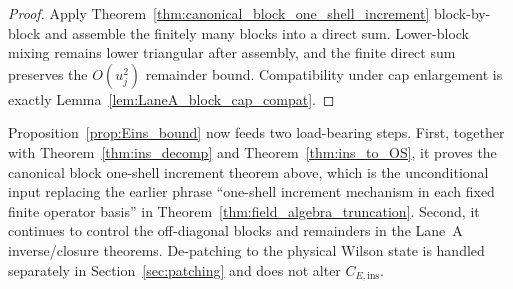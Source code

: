 \begin{proof}
Apply Theorem~\ref{thm:canonical_block_one_shell_increment} block-by-block and assemble the finitely many blocks into a direct sum.
Lower-block mixing remains lower triangular after assembly, and the finite direct sum preserves the $O(u_j^2)$ remainder bound.
Compatibility under cap enlargement is exactly Lemma~\ref{lem:LaneA_block_cap_compat}.
\end{proof}

\begin{remark}
Proposition~\ref{prop:Eins_bound} now feeds two load-bearing steps.
First, together with Theorem~\ref{thm:ins_decomp} and Theorem~\ref{thm:ins_to_OS}, it proves the canonical block one-shell increment theorem above,
which is the unconditional input replacing the earlier phrase ``one-shell increment mechanism in each fixed finite operator basis'' in Theorem~\ref{thm:field_algebra_truncation}.
Second, it continues to control the off-diagonal blocks and remainders in the Lane~A inverse/closure theorems.
De-patching to the physical Wilson state is handled separately in Section~\ref{sec:patching} and does not alter $C_{E,\mathrm{ins}}$.
\end{remark}
